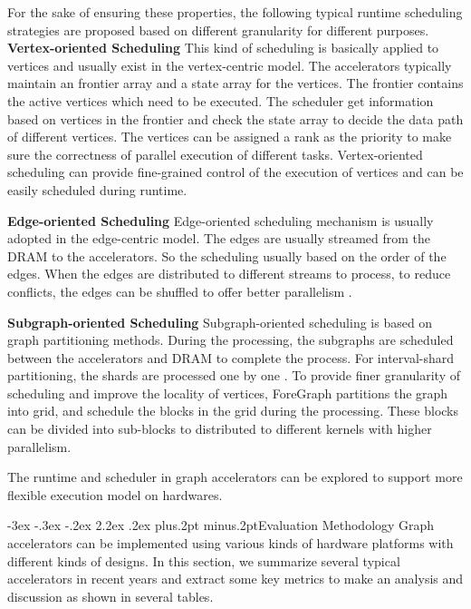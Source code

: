 \documentclass[twoside]{article}
\makeatletter
\def\section{\@startsection{section}{1}{\z@}%
 {-3ex \@plus -.3ex \@minus -.2ex}%
 {2.2ex \@plus.2ex}%
{\normalfont\normalsize\protect\baselineskip=14.5pt plus.2pt minus.2pt\bfseries}}
\makeatother
\begin{document}
\begin{multicols}{2}
For the sake of ensuring these properties, the following typical runtime scheduling strategies are proposed based on different granularity for different purposes. 
{\bf Vertex-oriented Scheduling}
This kind of scheduling is basically applied to vertices and usually exist in the vertex-centric model. The accelerators typically maintain an frontier array and a state array for the vertices. The frontier contains the active vertices which need to be executed. The scheduler get information based on vertices in the frontier and check the state array to decide the data path of different vertices. The vertices can be assigned a rank as the priority to make sure the correctness of parallel execution of different tasks. Vertex-oriented scheduling can provide fine-grained control of the execution of vertices and can be easily scheduled during runtime.

{\bf Edge-oriented Scheduling}
Edge-oriented scheduling mechanism is usually adopted in the edge-centric model. The edges are usually streamed from the DRAM to the accelerators. So the scheduling usually based on the order of the edges. When the edges are distributed to different streams to process, to reduce conflicts, the edges can be shuffled to offer better parallelism \cite{Dai2017foregraph}.

{\bf Subgraph-oriented Scheduling}
Subgraph-oriented scheduling is based on graph partitioning methods. During the processing, the subgraphs are scheduled between the accelerators and DRAM to complete the process. For interval-shard partitioning, the shards are processed one by one \cite{zhou2016highthroughput}. To provide finer granularity of scheduling and improve the locality of vertices, ForeGraph \cite{Dai2017foregraph} partitions the graph into grid, and schedule the blocks in the grid during the processing. These blocks can be divided into sub-blocks to distributed to different kernels with higher parallelism. 

The runtime and scheduler in graph accelerators can be explored to support more flexible execution model on hardwares. 


\section{Evaluation Methodology}
Graph accelerators can be implemented using various kinds of hardware platforms with different kinds of designs. In this section, we summarize several typical accelerators in recent years and extract some key metrics to make an analysis and discussion as shown in several tables. 


\end{multicols}
\end{document}
